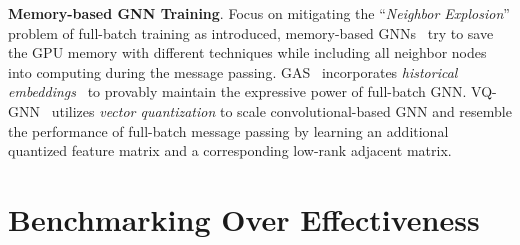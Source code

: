 \message{ !name(main.tex)}\documentclass{article}
\begin{document}
\textbf{Memory-based GNN Training}. Focus on mitigating the ``\textit{Neighbor Explosion}'' problem of full-batch training as introduced, memory-based GNNs~\cite{fey2021gnnautoscale, ding2021vq} try to save the GPU memory with different techniques while including all neighbor nodes into computing during the message passing. GAS~\cite{fey2021gnnautoscale} incorporates \textit{historical embeddings}~\cite{chen2017stochastic} to provably maintain the expressive power of full-batch GNN. VQ-GNN~\cite{ding2021vq} utilizes \textit{vector quantization} to scale convolutional-based GNN and resemble the performance of full-batch message passing by learning an additional quantized feature matrix and a corresponding low-rank adjacent matrix.

\vspace{-3mm}
\section{Benchmarking Over Effectiveness}\label{sec:benchmarking_effectiveness}
\vspace{-1mm}
\end{document}
